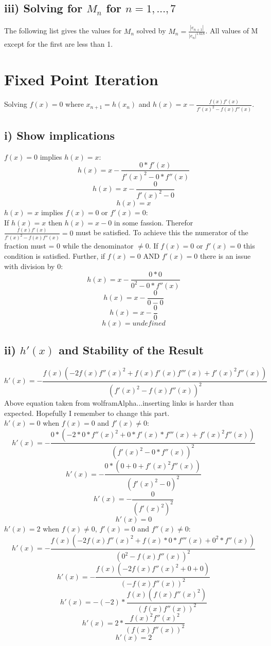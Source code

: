 \documentclass[12pt]{article}
\def\myoutput#1{{\fontsize{10}{11}\selectfont\verbatimtabinput{#1}}}
\begin{document}
\subsection*{iii) Solving for $M_n$ for $n=1,...,7$}
The following list gives the values for $M_n$ solved by $M_n=\frac{|e_{n+1}|}{|e_n|^{1.618}}$.
\myoutput{secantM.out}
\noindent
All values of M except for the first are less than 1.

\section{Fixed Point Iteration}
Solving $f(x)=0$ where $x_{n+1}=h(x_n)$ and $h(x)=x-\frac{f(x)f'(x)}{f'(x)^2-f(x)f''(x)}$.
\subsection*{i) Show implications}
$f(x)=0$ implies $h(x)=x$:
\[h(x)=x-\frac{0*f'(x)}{f'(x)^2-0*f''(x)}\]
\[h(x)=x-\frac{0}{f'(x)^2-0}\]
\[h(x)=x\]
$h(x)=x$ implies $f(x)=0$ or $f'(x)=0$:\\
If $h(x)=x$ then $h(x)=x-0$ in some fassion. Therefor $\frac{f(x)f'(x)}{f'(x)^2-f(x)f''(x)}=0$ must be satisfied. To achieve this the numerator of the fraction must = 0 while the denominator $\neq{0}$. If $f(x)=0$ or $f'(x)=0$ this condition is satisfied. Further, if $f(x)=0$ AND $f'(x)=0$ there is an issue with division by 0:
\[h(x)=x-\frac{0*0}{0^2-0*f''(x)}\]
\[h(x)=x-\frac{0}{0-0}\]
\[h(x)=x-\frac{0}{0}\]
\[h(x)=undefined\]
\subsection*{ii) $h'(x)$ and Stability of the Result}
\[h'(x)=-\frac{f(x)(-2f(x)f''(x)^2+f(x)f'(x)f'''(x)+f'(x)^2f''(x))}{(f'(x)^2-f(x)f''(x))^2}\]
Above equation taken from wolframAlpha...inserting links is harder than expected. Hopefully I remember to change this part.\\
$h'(x)=0$ when $f(x)=0$ and $f'(x)\neq{0}$:
\[h'(x)=-\frac{0*(-2*0*f''(x)^2+0*f'(x)*f'''(x)+f'(x)^2f''(x))}{(f'(x)^2-0*f''(x))^2}\]
\[h'(x)=-\frac{0*(0+0+f'(x)^2f''(x))}{(f'(x)^2-0)^2}\]
\[h'(x)=-\frac{0}{(f'(x)^2)^2}\]
\[h'(x)=0\]
$h'(x)=2$ when $f(x)\neq{0}$, $f'(x)=0$ and $f''(x)\neq{0}$:
\[h'(x)=-\frac{f(x)(-2f(x)f''(x)^2+f(x)*0*f'''(x)+0^2*f''(x))}{(0^2-f(x)f''(x))^2}\]
\[h'(x)=-\frac{f(x)(-2f(x)f''(x)^2+0+0)}{(-f(x)f''(x))^2}\]
\[h'(x)=-(-2)*\frac{f(x)(f(x)f''(x)^2)}{(f(x)f''(x))^2}\]
\[h'(x)=2*\frac{f(x)^2f''(x)^2}{(f(x)f''(x))^2}\]
\[h'(x)=2\]
\end{document}
